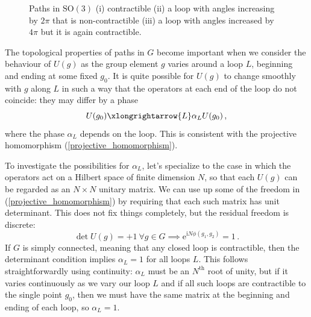 \documentclass{article}
\theoremstyle{plain}\theoremheaderfont{\normalfont\itshape}\theorembodyfont{\rmfamily}\theoremseparator{.}\newtheorem*{rem}{Remark}\newtheorem*{ex}{Example}\newtheorem*{proof}{Proof}\newtheorem*{altp}{Alternative proof}
\theoremstyle{plain}\theoremheaderfont{\normalfont\bfseries}\theorembodyfont{\rmfamily}\theoremseparator{.}\newtheorem{thm}{Theorem}[section]\newtheorem{lem}[thm]{Lemma}\newtheorem{prop}[thm]{Proposition}\newtheorem*{cor}{Corollary}\newtheorem{defn}[thm]{Definition}\newtheorem{clm}[thm]{Claim}\newtheorem{clminproof}{Claim}
\theoremstyle{break}\theoremheaderfont{\normalfont\itshape}\theorembodyfont{\rmfamily}\theoremseparator{.\medskip}\newtheorem*{proofskip}{Proof}\newtheorem*{exs}{Examples}\newtheorem*{rems}{Remarks}
\theoremstyle{break}\theoremheaderfont{\normalfont\bfseries}\theorembodyfont{\rmfamily}\theoremseparator{.\medskip}\newtheorem{lemskip}[thm]{Lemma}\newtheorem{defnskip}[thm]{Definition}\newtheorem{propskip}[thm]{Proposition}\newtheorem{thmskip}[thm]{Theorem}
\numberwithin{equation}{section}
\newcommand{\ii}{\mathrm{i}}
\newcommand{\ee}{\mathrm{e}}
\newcommand{\SO}{\mathrm{SO}}
\begin{document}
\begin{figure}
        \caption{Paths in \(\SO(3)\) (i) contractible (ii) a loop with angles increasing by \(2\pi\) that is non-contractible (iii) a loop with angles increased by \(4\pi\) but it is again contractible.}
        \label{Fig:SO3}
    \end{figure}

    The topological properties of paths in \(G\) become important when we consider the behaviour of \(U(g)\) as the group element \(g\) varies around a loop \(L\), beginning and ending at some fixed \(g_0\). It is quite possible for \(U(g)\) to change smoothly with \(g\) along \(L\) in such a way that the operators at each end of the loop do not coincide: they may differ by a phase
    \begin{equation}
        U(g_0)\xlongrightarrow{L}\alpha_L U(g_0)\,,
    \end{equation}
    where the phase \(\alpha_L\) depends on the loop. This is consistent with the projective homomorphism (\ref{projective_homomorphism}).

    To investigate the possibilities for \(\alpha_L\), let's specialize to the case in which the operators act on a Hilbert space of finite dimension \(N\), so that each \(U(g)\) can be regarded as an \(N\times N\) unitary matrix. We can use up some of the freedom in (\ref{projective_homomorphism}) by requiring that each such matrix has unit determinant. This does not fix things completely, but the residual freedom is discrete:
    \begin{equation}
        \det U(g)=+1\ \forall g\in G\implies \ee^{\ii N\phi(g_1,g_2)}=1\,.
    \end{equation}
    If \(G\) is simply connected, meaning that any closed loop is contractible, then the determinant condition implies \(\alpha_L=1\) for all loops \(L\). This follows straightforwardly using continuity: \(\alpha_L\) must be an \(N^{\text{th}}\) root of unity, but if it varies continuously as we vary our loop \(L\) and if all such loops are contractible to the single point \(g_0\), then we must have the same matrix at the beginning and ending of each loop, so \(\alpha_L=1\).
    
\end{document}
